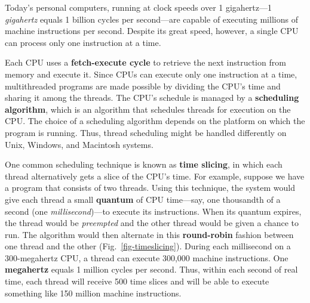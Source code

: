 Today's personal computers, running at clock speeds over 1
gigahertz---1 {\it gigahertz} equals 1 billion cycles per second---are capable of executing 
millions of machine instructions per second.
Despite its great speed, however, a single CPU can process only one
instruction at a time.

Each CPU uses a {\bf fetch-execute cycle}
to retrieve the next instruction from memory and execute it.  Since
CPUs can execute only one instruction at a time, multithreaded
programs are made possible by dividing the CPU's time and sharing it
among the threads.  The CPU's schedule is managed by a {\bf scheduling
algorithm}, which is an algorithm that schedules threads for execution
on the CPU. The choice of a scheduling algorithm depends on the
platform on which the program is running. Thus, thread scheduling might
be handled differently on Unix, Windows, and Macintosh systems.


\begin{figure}[tb]
\end{figure}

One common scheduling technique is known as {\bf time slicing},
in which each thread alternatively gets a slice of the CPU's time.
For example, suppose we have a program that consists of two threads.
Using this technique, the system would give each thread a small {\bf
quantum} of CPU time---say, one thousandth of a second (one {\it
millisecond})---to execute its instructions.  When its quantum
expires, the thread would be {\it preempted} and the other thread
would be given a chance to run.  The algorithm would then alternate in this
{\bf round-robin} fashion between one thread and the other
(Fig.~\ref{fig-timeslicing}). During each millisecond on a 300-megahertz CPU, 
a thread can execute 300,000 machine
instructions.  One {\bf megahertz} equals 1 million
cycles per second. Thus, within each second of real time, each thread will
receive 500 time slices and will be able to execute something like
150 million machine instructions.


